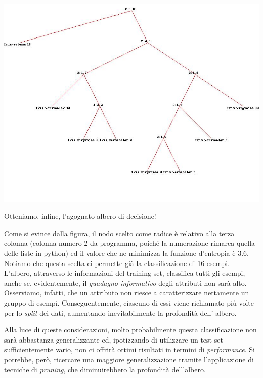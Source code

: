 			\includegraphics[scale=0.55]{iris.jpg}
		
			Otteniamo, infine, l'agognato albero di decisione!\par
			Come si evince dalla figura, il nodo scelto come radice è relativo alla terza colonna (colonna numero 2 da programma, poiché la numerazione rimarca quella delle liste in python) ed il valore che ne minimizza la funzione d'entropia è 3.6. Notiamo che questa scelta ci permette già la classificazione di 16 esempi.
			L'albero, attraverso le informazioni del training set, classifica tutti gli esempi, anche se, evidentemente, il \emph{guadagno informativo} degli attributi non sarà alto. Osserviamo, infatti, che un attributo non riesce a caratterizzare nettamente un gruppo di esempi. Conseguentemente, ciascuno di essi viene richiamato più volte per lo \emph{split} dei dati, aumentando inevitabilmente la profondità dell' albero.\par
			Alla luce di queste considerazioni, molto probabilmente questa classificazione non sarà abbastanza generalizzante ed, ipotizzando di utilizzare un test set sufficientemente vario, non ci offrirà ottimi risultati in termini di \emph{performance}. Si potrebbe, però, ricercare una maggiore generalizzazione tramite l'applicazione di tecniche di \emph{pruning}, che diminuirebbero la profondità dell'albero.\par
